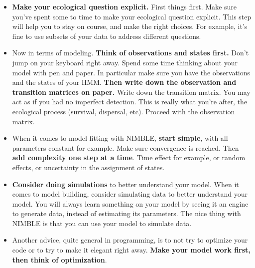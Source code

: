 \documentclass[
  12pt,
]{krantz}
\begin{document}
\begin{itemize}
\item
  \textbf{Make your ecological question explicit.} First things first. Make sure you've spent some to time to make your ecological question explicit. This step will help you to stay on course, and make the right choices. For example, it's fine to use subsets of your data to address different questions.
\item
  Now in terms of modeling. \textbf{Think of observations and states first.} Don't jump on your keyboard right away. Spend some time thinking about your model with pen and paper. In particular make sure you have the observations and the states of your HMM. \textbf{Then write down the observation and transition matrices on paper.} Write down the transition matrix. You may act as if you had no imperfect detection. This is really what you're after, the ecological process (survival, dispersal, etc). Proceed with the observation matrix.
\item
  When it comes to model fitting with NIMBLE, \textbf{start simple}, with all parameters constant for example. Make sure convergence is reached. Then \textbf{add complexity one step at a time}. Time effect for example, or random effects, or uncertainty in the assignment of states.
\item
  \textbf{Consider doing simulations} to better understand your model. When it comes to model building, consider simulating data to better understand your model. You will always learn something on your model by seeing it an engine to generate data, instead of estimating its parameters. The nice thing with NIMBLE is that you can use your model to simulate data.
\item
  Another advice, quite general in programming, is to not try to optimize your code or to try to make it elegant right away. \textbf{Make your model work first, then think of optimization}.
\end{itemize}

\backmatter

  

\printindex
\end{document}
